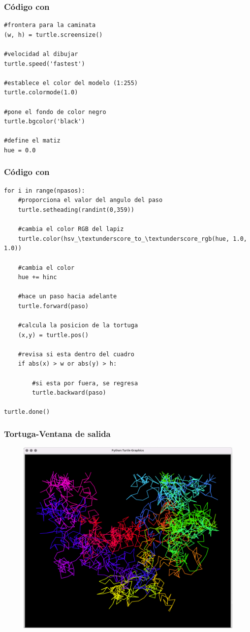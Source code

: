 \documentclass[12pt]{beamer}
\begin{document}
\begin{frame}
\frametitle{Código con \python}
\begin{lstlisting}[caption=Aspecto gráfico del entorno]
#frontera para la caminata
(w, h) = turtle.screensize()

#velocidad al dibujar
turtle.speed('fastest')

#establece el color del modelo (1:255)
turtle.colormode(1.0)

#pone el fondo de color negro
turtle.bgcolor('black')

#define el matiz
hue = 0.0
\end{lstlisting}
\end{frame}
\begin{frame}
\frametitle{Código con \python}
\begin{lstlisting}[caption=Definición de pasos y dirección]
for i in range(npasos):
	#proporciona el valor del angulo del paso
    turtle.setheading(randint(0,359))
    
    #cambia el color RGB del lapiz
    turtle.color(hsv_\textunderscore_to_\textunderscore_rgb(hue, 1.0, 1.0))
    
    #cambia el color
    hue += hinc
    
    #hace un paso hacia adelante
    turtle.forward(paso)
    
    #calcula la posicion de la tortuga
    (x,y) = turtle.pos()
    
    #revisa si esta dentro del cuadro
    if abs(x) > w or abs(y) > h:
    	
    	#si esta por fuera, se regresa
        turtle.backward(paso)
        
turtle.done()
\end{lstlisting}
\end{frame}
\begin{frame}
\frametitle{Tortuga-Ventana de salida}
\begin{figure}
	\centering
	\includegraphics[scale=0.24]{Imagenes/caminata_aleatoria_turtle_01.png}
\end{figure}
\end{frame}
\end{document}
